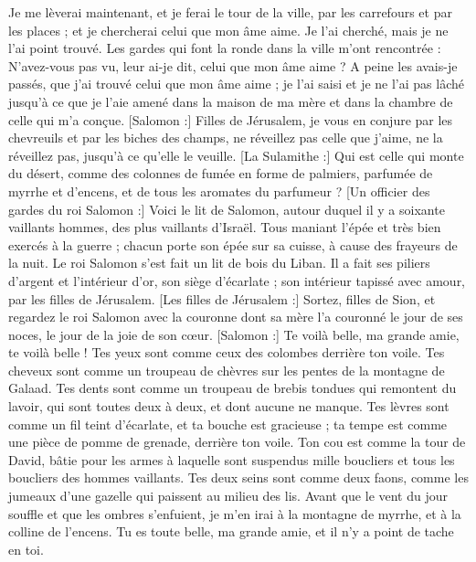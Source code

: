\begin{multicols}{2}
Je me lèverai maintenant, et je ferai le tour de la ville, par les carrefours et par les places ; et je chercherai celui que mon âme aime. Je l'ai cherché, mais je ne l'ai point trouvé.
Les gardes qui font la ronde dans la ville m'ont rencontrée : N'avez-vous pas vu, leur ai-je dit, celui que mon âme aime ?
A peine les avais-je passés, que j'ai trouvé celui que mon âme aime ; je l'ai saisi et je ne l'ai pas lâché jusqu'à ce que je l'aie amené dans la maison de ma mère et dans la chambre de celle qui m'a conçue.
[Salomon :] Filles de Jérusalem, je vous en conjure par les chevreuils et par les biches des champs, ne réveillez pas celle que j'aime, ne la réveillez pas, jusqu'à ce qu'elle le veuille.
[La Sulamithe :] Qui est celle qui monte du désert, comme des colonnes de fumée en forme de palmiers, parfumée de myrrhe et d'encens, et de tous les aromates du parfumeur ?
[Un officier des gardes du roi Salomon :] Voici le lit de Salomon, autour duquel il y a soixante vaillants hommes, des plus vaillants d'Israël.
Tous maniant l'épée et très bien exercés à la guerre ; chacun porte son épée sur sa cuisse, à cause des frayeurs de la nuit.
Le roi Salomon s'est fait un lit de bois du Liban.
Il a fait ses piliers d'argent et l'intérieur d'or, son siège d'écarlate ; son intérieur tapissé avec amour, par les filles de Jérusalem.
[Les filles de Jérusalem :] Sortez, filles de Sion, et regardez le roi Salomon avec la couronne dont sa mère l'a couronné le jour de ses noces, le jour de la joie de son cœur.
\VerseOne{}[Salomon :] Te voilà belle, ma grande amie, te voilà belle ! Tes yeux sont comme ceux des colombes derrière ton voile. Tes cheveux sont comme un troupeau de chèvres sur les pentes de la montagne de Galaad.
Tes dents sont comme un troupeau de brebis tondues qui remontent du lavoir, qui sont toutes deux à deux, et dont aucune ne manque.
Tes lèvres sont comme un fil teint d'écarlate, et ta bouche est gracieuse ; ta tempe est comme une pièce de pomme de grenade, derrière ton voile.
Ton cou est comme la tour de David, bâtie pour les armes à laquelle sont suspendus mille boucliers et tous les boucliers des hommes vaillants.
Tes deux seins sont comme deux faons, comme les jumeaux d'une gazelle qui paissent au milieu des lis.
Avant que le vent du jour souffle et que les ombres s'enfuient, je m'en irai à la montagne de myrrhe, et à la colline de l'encens.
Tu es toute belle, ma grande amie, et il n'y a point de tache en toi.

\end{multicols}
